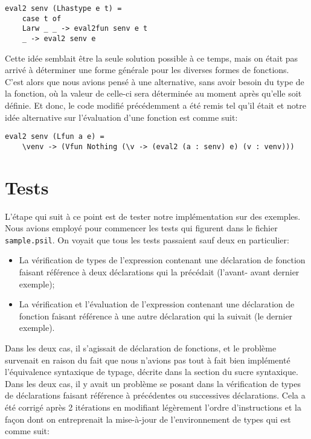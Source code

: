 \documentclass[10pt, titlepage]{article}
\begin{document}
\begin{lstlisting}
eval2 senv (Lhastype e t) =
    case t of
    Larw _ _ -> eval2fun senv e t
    _ -> eval2 senv e
\end{lstlisting}
Cette idée semblait être la seule solution possible à ce temps, mais on était
pas arrivé à déterminer une forme générale pour les diverses formes de
fonctions. C'est alors que nous avions pensé à une alternative, sans avoir
besoin du type de la fonction, où la valeur de celle-ci sera déterminée au
moment après qu'elle soit définie. Et donc, le code modifié précédemment a été
remis tel qu'il était et notre idée alternative sur l'évaluation d'une fonction
est comme suit:

\begin{lstlisting}
eval2 senv (Lfun a e) =
    \venv -> (Vfun Nothing (\v -> (eval2 (a : senv) e) (v : venv)))
\end{lstlisting}

\section{Tests}

L'étape qui suit à ce point est de tester notre implémentation sur des
exemples. Nous avions employé pour commencer les tests qui figurent dans le
fichier \texttt{sample.psil}. On voyait que tous les tests passaient sauf deux
en particulier:

\begin{itemize}
    \item La vérification de types de l'expression contenant une déclaration de
    fonction faisant référence à deux déclarations qui la précédait (l'avant-
    avant dernier exemple);
    \item La vérification et l'évaluation de l'expression contenant une
    déclaration de fonction faisant référence à une autre déclaration qui la
    suivait (le dernier exemple).
\end{itemize}

Dans les deux cas, il s'agissait de déclaration de fonctions, et le problème
survenait en raison du fait que nous n'avions pas tout à fait bien implémenté
l'équivalence syntaxique de typage, décrite dans la section du sucre
syntaxique. \\

Dans les deux cas, il y avait un problème se posant dans la vérification de
types de déclarations faisant référence à précédentes ou successives
déclarations. Cela a été corrigé après 2 itérations en modifiant légèrement
l'ordre d'instructions et la façon dont on entreprenait la mise-à-jour de
l'environnement de types qui est comme suit:
\end{document}
